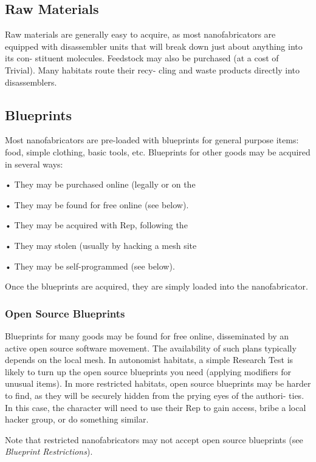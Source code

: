 \subsection{Raw Materials}

Raw materials are generally easy to acquire, as most 
nanofabricators are equipped with disassembler units 
that will break down just about anything into its con-
stituent molecules. Feedstock may also be purchased 
(at a cost of Trivial). Many habitats route their recy-
cling and waste products directly into disassemblers.

\subsection{Blueprints}

Most nanofabricators are pre-loaded with blueprints 
for general purpose items: food, simple clothing, basic 
tools, etc. Blueprints for other goods may be acquired 
in several ways:

•  They may be purchased online (legally or on the 

•  They may be found for free online (see below).

•  They may be acquired with Rep, following the 

•  They may stolen (usually by hacking a mesh site 

•  They may be self-programmed (see below).

Once the blueprints are acquired, they are simply 
loaded into the nanofabricator.

\subsubsection{Open Source Blueprints}

Blueprints for many goods may be found for free 
online, disseminated by an active open source 
software movement. The availability of such plans 
typically depends on the local mesh. In autonomist 
habitats, a simple Research Test is likely to turn up the 
open source blueprints you need (applying modifiers 
for unusual items). In more restricted habitats, open 
source blueprints may be harder to find, as they will 
be securely hidden from the prying eyes of the authori-
ties. In this case, the character will need to use their 
Rep to gain access, bribe a local hacker group, or do 
something similar.

Note that restricted nanofabricators may not accept 
open source blueprints (see \textit{Blueprint Restrictions}).

